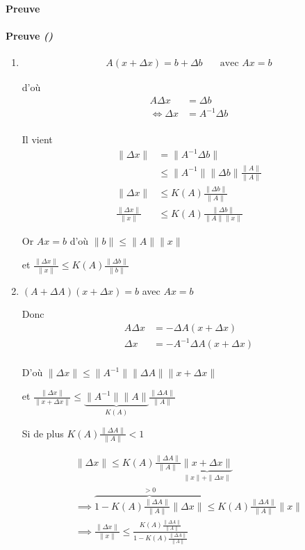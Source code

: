 \documentclass{article}
\newenvironment{proof}[1][\unskip]{
	\def\temp{#1}\ifx\temp\empty
		\paragraph{Preuve}
	\else
		\paragraph{Preuve \emph{(#1)}}
	\fi

}{}
\begin{document}
\begin{example}
\begin{proof}
\begin{enumerate}
    \item \begin{align*}
        A(x+\Delta x) = b + \Delta b \quad&\text{avec $A x = b$}
    \end{align*}

    d'où \begin{align*}
        A \Delta x &= \Delta b \\
        \iff \Delta x &= A^{-1} \Delta b \\
    \end{align*}

    Il vient \begin{align*}
        \|\Delta x\| &= \|A^{-1} \Delta b\|  \\
                     &\le \|A^{-1}\| \|\Delta b\| \frac{\|A\|}{\|A\|} \\
        \|\Delta x\| &\le K(A) \frac{\|\Delta b\|}{\|A\|} \\
        \frac{\|\Delta x\|}{\|x\|} &\le K(A) \frac{\|\Delta b\|}{\|A\| \|x\|}
    \end{align*}

    Or $Ax = b$ d'où $\|b\| \le \|A\| \|x\|$


    et $\frac{\|\Delta x\|}{\|x\|} \le  K(A) \frac{\|\Delta b\|}{\|b\|}$

 \item $(A+\Delta A)(x + \Delta x) = b$ avec  $Ax = b$

     Donc  \begin{align*}
         A \Delta x &= - \Delta A (x + \Delta x ) \\
         \Delta x &= -A^{-1} \Delta A (x + \Delta x ) \\
     \end{align*}


     D'où $\|\Delta x\| \le \|A^{-1}\| \|\Delta A\| \|x + \Delta x \|$

     et $\frac{\|\Delta x\|}{\|x + \Delta x \|} \le  \underbrace{\|A^{-1}\| \|A\|}_{K(A)} \frac{\|\Delta A\|}{\| A\|}$


     Si de plus $K(A) \frac{\|\Delta A\|}{\|A\|} < 1$

     \begin{align*}
         \|\Delta x\| \le  K(A) \frac{\|\Delta A\|}{\|A\|} \underbrace{\|x + \Delta x \|}_{\|x\| + \|\Delta x\|} \\
         \implies \overbrace{1 - K(A) \frac{\|\Delta A\|}{\|A\|} \|\Delta x\|}^{> 0} \le K(A) \frac{\|\Delta A\|}{\|A\|} \|x\| \\
         \implies \frac{\|\Delta x\|}{\|x\| } \le \frac{K(A) \frac{\|\Delta A\|}{\|A\|}}{1 - K(A) \frac{\|\Delta A\|}{\|A\|}}
     \end{align*}
\end{enumerate} 
\end{proof}

\end{example}
\end{document}
